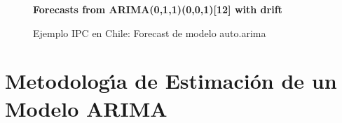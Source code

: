 \vspace{4mm}	
\begin{figure}[H]
	\centering
	\textbf{Forecasts from ARIMA(0,1,1)(0,0,1)[12] with drift}\par\medskip
	\caption{Ejemplo IPC en Chile: Forecast de modelo auto.arima}\label{fig27}
\end{figure}

\pagebreak\section{Metodolog\'{\i}a de Estimaci\'on de un Modelo ARIMA}
